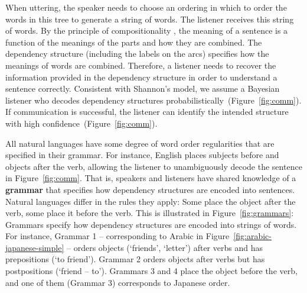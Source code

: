 \documentclass[9pt,twocolumn,twoside,lineno]{pnas-new}
\newcommand{\key}[1]{\textbf{#1}}
\begin{document}
When uttering, the speaker needs to choose an ordering in which to order the words in this tree to generate a string of words.
The listener receives this string of words.
By the principle of compositionality \cite{frege1892sinn}, the meaning of a sentence is a function of the meanings of the parts and how they are combined.
The dependency structure (including the labels on the arcs) specifies how the meanings of words are combined.
Therefore, a listener needs to recover the information provided in the dependency structure in order to understand a sentence correctly.
Consistent with Shannon's model, we assume a Bayesian listener who decodes dependency structures probabilistically~(Figure~\ref{fig:comm}).
If communication is successful, the listener can identify the intended structure with high confidence~(Figure~\ref{fig:comm}).



All natural languages have some degree of word order regularities that are specified in their grammar.
For instance, English places subjects before and objects after the verb, allowing the listener to unambiguously decode the sentence in Figure~\ref{fig:comm}.
That is, speakers and listeners have shared knowledge of a \key{grammar} that specifies how dependency structures are encoded into sentences.
Natural languages differ in the rules they apply: Some place the object after the verb, some place it before the verb.
This is illustrated in Figure~\ref{fig:grammars}: Grammars specify how dependency structures are encoded into strings of words.
For instance, Grammar 1 -- corresponding to Arabic in Figure~\ref{fig:arabic-japanese-simple} -- orders objects (`friends', `letter') after verbs and has prepositions (`to friend').
Grammar 2 orders objects after verbs but has postpositions (`friend -- to').
Grammars 3 and 4 place the object before the verb, and one of them (Grammar 3) corresponds to Japanese order.
\end{document}
